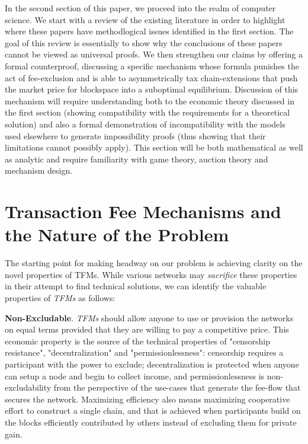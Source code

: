 \documentclass[sigconf,anonymous]{aamas}
\renewcommand{\paragraph}[1]{\smallskip\noindent\textbf{#1}}
\begin{document}
In the second section of this paper, we proceed into the realm of computer science. We start with a review of the existing literature in order to highlight where these papers have methodlogical issues identified in the first section. The goal of this review is essentially to show why the conclusions of these papers cannot be viewed as universal proofs. We then strengthen our claims by offering a formal counterproof, discussing a specific mechanism whose formula punishes the act of fee-exclusion and is able to asymmetrically tax chain-extensions that push the market price for blockspace into a suboptimal equilibrium. Discussion of this mechanism will require understanding both to the economic theory discussed in the first section (showing compatibility with the requirements for a theoretical solution) and also a formal demonstration of incompatibility with the models used elsewhere to generate impossibility proofs (thus showing that their limitations cannot possibly apply). This section will be both mathematical as well as analytic and require familiarity with game theory, auction theory and mechanism design.


\section{Transaction Fee Mechanisms and the Nature of the Problem\label{sec::section1p1}}

The starting point for making headway on our problem is achieving clarity on the novel properties of TFMs. While various networks may \textit{sacrifice} these properties in their attempt to find technical solutions, we can identify the valuable properties of \textit{TFMs} as follows:

\paragraph{Non-Excludable}. \textit{TFMs} should allow anyone to use or provision the networks on equal terms provided that they are willing to pay a competitive price. This economic property is the source of the technical properties of "censorship resistance", "decentralization" and "permissionlessness": censorship requires a participant with the power to exclude; decentralization is protected when anyone can setup a node and begin to collect income, and permissionlessness is non-excludability from the perspective of the use-cases that generate the fee-flow that secures the network. Maximizing efficiency also means maximizing cooperative effort to construct a single chain, and that is achieved when participants build on the blocks efficiently contributed by others instead of excluding them for private gain.
\end{document}
